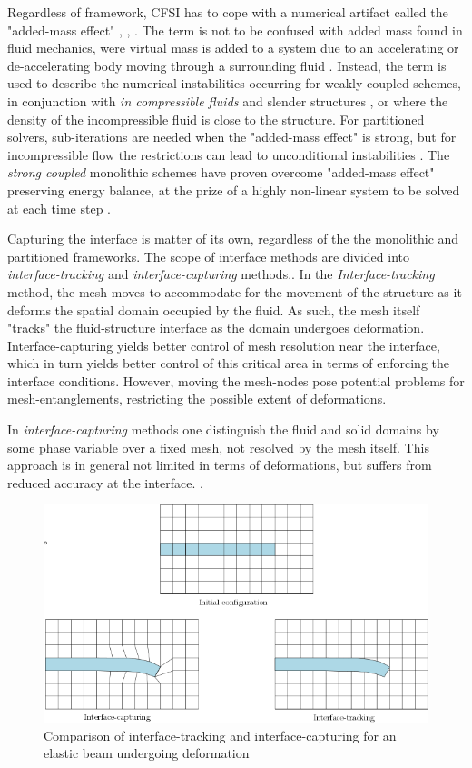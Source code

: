 Regardless of framework, CFSI has to cope with a numerical artifact called the "added-mass effect" \cite{Fernandez2007}, \cite{Fernandez2009}, \cite{Forster2007}. The term is not to be confused with added mass found in fluid mechanics, were virtual mass is added to a system due to an accelerating or de-accelerating body moving through a surrounding fluid \cite{Newman1977}. Instead, the term is used to describe the numerical instabilities occurring for weakly coupled schemes, in conjunction with \textit{in compressible fluids} and slender structures \cite{Forster2007}, or where the density of the incompressible fluid is close to the structure. For partitioned solvers, sub-iterations are needed when the "added-mass effect" is strong, but for incompressible flow the restrictions  can lead to unconditional instabilities \cite{Gatzhammer2014}. The \textit{strong coupled} monolithic schemes have proven overcome "added-mass effect" preserving energy balance, at the prize of a highly non-linear system to be solved at each time step \cite{Fernandez2007}.


Capturing the interface is matter of its own, regardless of the the monolithic and partitioned frameworks.
The scope of interface methods are divided into \textit{interface-tracking} and \textit{interface-capturing } methods.\cite{Frei2016}. In the \textit{Interface-tracking} method, the mesh moves to accommodate for the movement of the structure as it deforms the spatial domain occupied by the fluid. As such, the mesh itself "tracks" the fluid-structure interface as the domain undergoes deformation. Interface-capturing yields better control of mesh resolution near the interface, which in turn yields better control of this critical area in terms of enforcing the interface conditions.
However, moving the mesh-nodes pose potential problems for mesh-entanglements, restricting the possible extent of deformations.  

In \textit{interface-capturing} methods one distinguish the fluid and solid domains by some phase variable over a fixed mesh, not resolved by the mesh itself. This approach is in general not limited in terms of deformations, but suffers from reduced accuracy at the interface. \cite{Frei2016}. 

\begin{figure}[h!]
  \centering
    \includegraphics[scale=0.5]{./Fig/interface.png}
      \caption{Comparison of interface-tracking and interface-capturing for an elastic beam undergoing deformation}
\end{figure}

